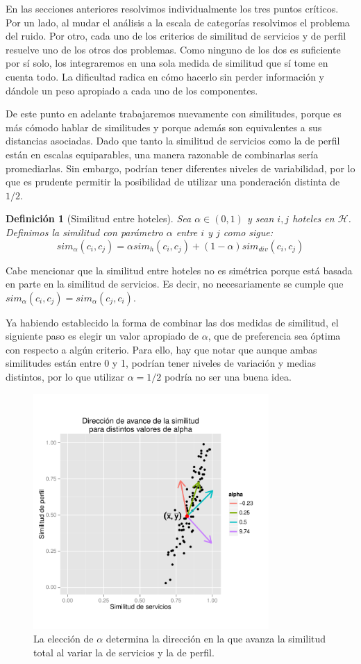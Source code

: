 \documentclass[12pt]{report}
\newcommand{\HH}{\mathcal{H}}
\newtheorem{defn}{Definici\'on}[chapter]
\begin{document}
En las secciones anteriores resolvimos individualmente los tres puntos críticos. Por un lado, al mudar el análisis a la escala de categorías resolvimos el problema del ruido. Por otro, cada uno de los criterios de similitud de servicios y de perfil resuelve uno de los otros dos problemas. Como ninguno de los dos es suficiente por sí solo, los integraremos en una sola medida de similitud que sí tome en cuenta todo. La dificultad radica en cómo hacerlo sin perder información y dándole un peso apropiado a cada uno de los componentes.

De este punto en adelante trabajaremos nuevamente con similitudes, porque es más cómodo hablar de similitudes y porque además son equivalentes a sus distancias asociadas. Dado que tanto la similitud de servicios como la de perfil están en escalas equiparables, una manera razonable de combinarlas sería promediarlas. Sin embargo, podrían tener diferentes niveles de variabilidad, por lo que es prudente permitir la posibilidad de utilizar una ponderación distinta de $1/2$.
\begin{defn}[Similitud entre hoteles]
Sea $\alpha \in (0,1)$ y sean $i, j$ hoteles en $\HH$. Definimos la similitud con parámetro $\alpha$ entre $i$ y $j$ como sigue:
\[
sim_\alpha(c_i, c_j) = \alpha sim_h(c_i, c_j) + (1 - \alpha) sim_{div}(c_i, c_j)
\]
\end{defn}
Cabe mencionar que la similitud entre hoteles no es simétrica porque está basada en parte en la similitud de servicios. Es decir, no necesariamente se cumple que $sim_\alpha(c_i, c_j) = sim_\alpha(c_j, c_i)$.

Ya habiendo establecido la forma de combinar las dos medidas de similitud, el siguiente paso es elegir un valor apropiado de $\alpha$, que de preferencia sea óptima con respecto a algún criterio. Para ello, hay que notar que aunque ambas similitudes están entre 0 y 1, podrían tener niveles de variación y medias distintos, por lo que utilizar $\alpha = 1/2$ podría no ser una buena idea.
\begin{figure}[ht]
	\centering
	\includegraphics[width=0.8\textwidth]{imagenes/alpha.pdf}
	\caption{\label{alpha} La elección de $\alpha$ determina la dirección en la que avanza la similitud total al variar la de servicios y la de perfil.}
\end{figure}
\end{document}
